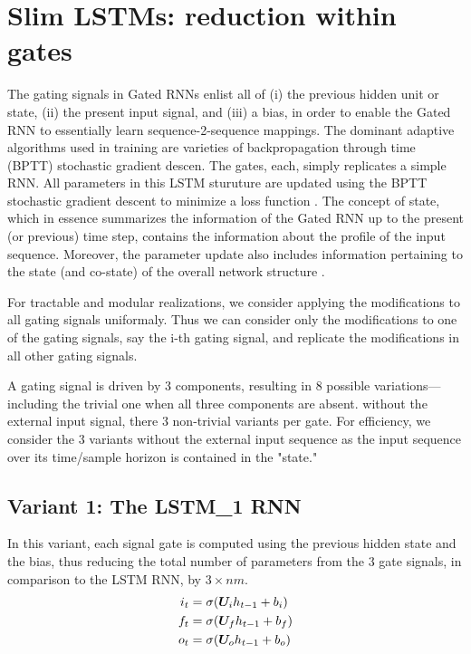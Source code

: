 \documentclass{article}
\begin{document}
\section{Slim LSTMs: reduction within gates}

The gating signals in Gated RNNs enlist all of (i) the previous hidden unit or state, (ii) the present input signal, and (iii) a bias, in order to enable the Gated RNN to essentially learn sequence-2-sequence mappings. The dominant adaptive algorithms used in training are varieties of backpropagation through time (BPTT)  stochastic gradient descen.  The gates, each, simply replicates a simple RNN. All parameters in this LSTM sturuture are updated using the BPTT stochastic gradient descent to minimize a loss function \cite{gers2002learning, Odyssey2016}. The concept of state, which in essence summarizes the information of the Gated RNN up to the present (or previous) time step, contains the information about the profile of the input sequence. Moreover, the parameter update also includes information pertaining to the state (and co-state) of the overall network structure  \cite{salem2016reduced,salem2016basic}.

For tractable and modular realizations, we consider applying the modifications to all gating signals uniformaly. Thus we can consider only the modifications to one of the gating signals, say the i-th gating signal, and replicate the modifications in all other gating signals.

A gating signal is driven by 3 components, resulting in 8 possible variations--- including the trivial one when all three components are absent. without the external input signal, there 3  non-trivial variants per gate. For efficiency, we consider the 3 variants without the external input sequence as the input sequence over its time/sample horizon is contained in the "state."
\\
\subsection{Variant 1: The LSTM\_1 RNN}
In this variant, each signal gate is computed using the previous hidden state and the bias, thus reducing the total number of parameters from the 3 gate signals, in comparison to the LSTM RNN, by $3 \times nm$.
\begin{align}
	i_t &= \sigma({\bm{U}}_i h_{t-1} + b_i)\\
	f_t &= \sigma({\bm{U}}_f h_{t-1} + b_f)\\
	o_t &= \sigma({\bm{U}}_o h_{t-1} + b_o)
\end{align}
\end{document}
